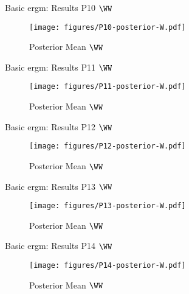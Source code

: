 \documentclass{beamer}
\begin{document}
\begin{frame}{Basic \acrshort{ergm}: Results P10 $\WW$}
	\begin{figure}[H]
		\centering
		\texttt{[image: figures/P10-posterior-W.pdf]}
		\caption{Posterior Mean $\WW$}
	\end{figure}
\end{frame}

\begin{frame}{Basic \acrshort{ergm}: Results P11 $\WW$}
	\begin{figure}[H]
		\centering
		\texttt{[image: figures/P11-posterior-W.pdf]}
		\caption{Posterior Mean $\WW$}
	\end{figure}
\end{frame}

\begin{frame}{Basic \acrshort{ergm}: Results P12 $\WW$}
	\begin{figure}[H]
		\centering
		\texttt{[image: figures/P12-posterior-W.pdf]}
		\caption{Posterior Mean $\WW$}
	\end{figure}
\end{frame}

\begin{frame}{Basic \acrshort{ergm}: Results P13 $\WW$}
	\begin{figure}[H]
		\centering
		\texttt{[image: figures/P13-posterior-W.pdf]}
		\caption{Posterior Mean $\WW$}
	\end{figure}
\end{frame}

\begin{frame}{Basic \acrshort{ergm}: Results P14 $\WW$}
	\begin{figure}[H]
		\centering
		\texttt{[image: figures/P14-posterior-W.pdf]}
		\caption{Posterior Mean $\WW$}
	\end{figure}
\end{frame}
\end{document}
